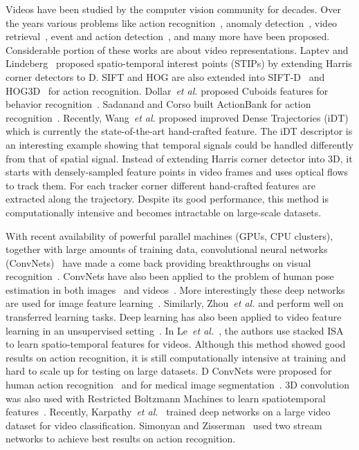 \documentclass[10pt,twocolumn,letterpaper]{article}
\begin{document}
Videos have been studied by the computer vision community for decades. Over the years various problems like action recognition~\cite{Laptev03}, anomaly detection~\cite{Boiman07}, video retrieval~\cite{bendersky14}, event and action detection~\cite{TRECVID,THUMOS14}, and many more have been proposed. Considerable portion of these works are about video representations. Laptev and Lindeberg~\cite{Laptev03} proposed spatio-temporal interest points (STIPs) by extending Harris corner detectors to D. SIFT and HOG are also extended into SIFT-D~\cite{Scovanner07} and HOG3D~\cite{KMS08} for action recognition. Dollar~\emph{et al.} proposed Cuboids features for behavior recognition~\cite{Piotr05}. Sadanand and Corso built ActionBank for action recognition~\cite{ActionBank}. Recently, Wang~\emph{et al.} proposed improved Dense Trajectories (iDT)~\cite{Wang2013} which is currently the state-of-the-art hand-crafted feature. The iDT descriptor is an interesting example showing that temporal signals could be handled differently from that of spatial signal. Instead of extending Harris corner detector into 3D, it starts with densely-sampled feature points in video frames and uses optical flows to track them. For each tracker corner different hand-crafted features are extracted along the trajectory. Despite its good performance, this method is computationally intensive and becomes intractable on large-scale datasets.

With recent availability of powerful parallel machines (GPUs, CPU clusters), together with large amounts of training data, convolutional neural networks (ConvNets)~\cite{LeNet5} have made a come back providing breakthroughs on visual recognition~\cite{girshick13,Krizhevsky12}. ConvNets have also been applied to the problem of human pose estimation in both images~\cite{jain14iclr} and videos~\cite{jain14accv}. More interestingly these deep networks are used for image feature learning~\cite{Donahue13}. Similarly, Zhou~\emph{et al.} and perform well on transferred learning tasks. Deep learning has also been applied to video feature learning in an unsupervised setting~\cite{Le2011}. In Le~\emph{et al.}~\cite{Le2011}, the authors use stacked ISA to learn spatio-temporal features for videos. Although this method showed good results on action recognition, it is still computationally intensive at training and hard to scale up for testing on large datasets. D ConvNets were proposed for human action recognition~\cite{Ming2013} and for medical image segmentation~\cite{jain10,turaga2010}. 3D convolution was also used with Restricted Boltzmann Machines to learn spatiotemporal features~\cite{taylor10}. Recently, Karpathy~\emph{et al.}~\cite{Karpathy14} trained deep networks on a large video dataset for video classification. Simonyan and Zisserman~\cite{SimonyanZ14} used two stream networks to achieve best results on action recognition. 
\end{document}
